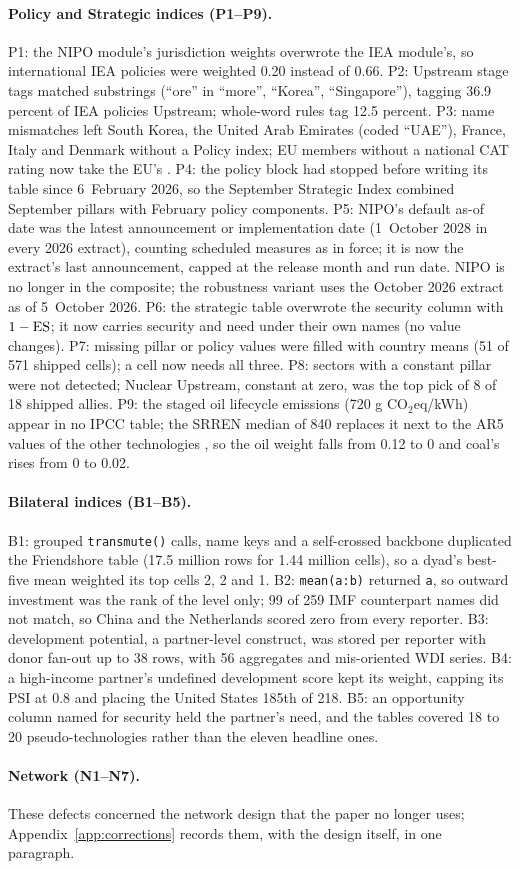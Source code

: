 \paragraph{Policy and Strategic indices (P1--P9).} P1: the NIPO module's jurisdiction weights
overwrote the IEA module's, so international IEA policies were weighted 0.20 instead of 0.66. P2:
Upstream stage tags matched substrings (``ore'' in ``more'', ``Korea'', ``Singapore''), tagging 36.9
percent of IEA policies Upstream; whole-word rules tag 12.5 percent. P3: name mismatches left South
Korea, the United Arab Emirates (coded ``UAE''), France, Italy and Denmark without a Policy index;
EU members without a national CAT rating now take the EU's \citep{cat2026ratings}. P4: the policy
block had stopped before writing its table since 6~February 2026, so the September Strategic Index
combined September pillars with February policy components. P5: NIPO's default as-of date was the
latest announcement or implementation date (1~October 2028 in every 2026 extract), counting
scheduled measures as in force; it is now the extract's last announcement, capped at the release
month and run date. NIPO is no longer in the composite; the robustness variant uses the October 2026
extract as of 5~October 2026. P6: the strategic table overwrote the security column with $1-\mathrm{ES}$; it
now carries security and need under their own names (no value changes). P7: missing pillar or policy
values were filled with country means (51 of 571 shipped cells); a cell now needs all three. P8:
sectors with a constant pillar were not detected; Nuclear Upstream, constant at zero, was the top
pick of 8 of 18 shipped allies. P9: the staged oil lifecycle emissions (720 g CO$_2$eq/kWh) appear in
no IPCC table; the SRREN median of 840 \citep{moomaw2011annex} replaces it next to the AR5 values of
the other technologies \citep{schlomer2014annex}, so the oil weight falls from 0.12 to 0 and coal's
rises from 0 to 0.02.

\paragraph{Bilateral indices (B1--B5).} B1: grouped \texttt{transmute()} calls, name keys and a
self-crossed backbone duplicated the Friendshore table (17.5 million rows for 1.44 million cells),
so a dyad's best-five mean weighted its top cells 2, 2 and 1. B2: \texttt{mean(a:b)} returned
\texttt{a}, so outward investment was the rank of the level only; 99 of 259 IMF counterpart names did
not match, so China and the Netherlands scored zero from every reporter. B3: development potential,
a partner-level construct, was stored per reporter with donor fan-out up to 38 rows, with 56
aggregates and mis-oriented WDI series. B4: a high-income partner's undefined development score kept
its weight, capping its PSI at 0.8 and placing the United States 185th of 218. B5: an opportunity
column named for security held the partner's need, and the tables covered 18 to 20 pseudo-technologies
rather than the eleven headline ones.

\paragraph{Network (N1--N7).} These defects concerned the network design that the paper no longer
uses; Appendix~\ref{app:corrections} records them, with the design itself, in one paragraph.
